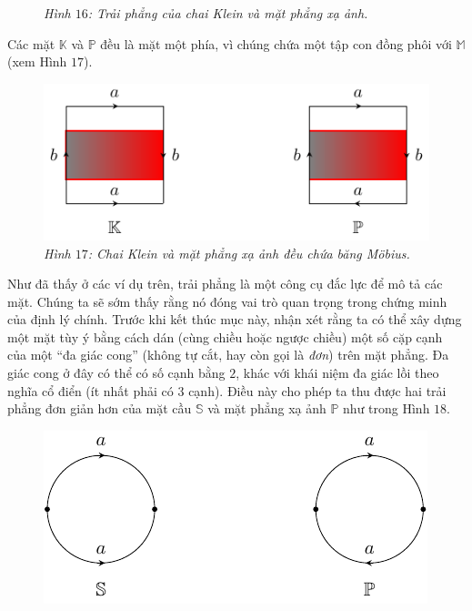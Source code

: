 \begin{multicols}{2}
\begin{figure}[H]
		\caption{\small\textit{\color{duongvaotoanhoc}Hình $16$: Trải phẳng của chai Klein và mặt phẳng xạ ảnh.}}
		\vspace*{-10pt}
	\end{figure}
	Các mặt $\mathbb{K}$ và $\mathbb{P}$ đều là mặt một phía, vì chúng chứa một tập con đồng phôi với $\mathbb{M}$ (xem Hình $17$).
	\begin{figure}[H]
		\vspace*{-5pt}
		\centering\captionsetup{labelformat=empty, justification=centering}
		\includegraphics[width=1\linewidth]{H17.pdf}
		\caption{\small\textit{\color{duongvaotoanhoc}Hình $17$: Chai Klein và mặt phẳng xạ ảnh đều chứa băng M\"obius.}}
		\vspace*{-10pt}
	\end{figure}
	Như đã thấy ở các ví dụ trên, trải phẳng là một công cụ đắc lực để mô tả các mặt. Chúng ta sẽ sớm thấy rằng nó đóng vai trò quan trọng trong chứng minh của định lý chính. Trước khi kết thúc mục này, nhận xét rằng ta có thể xây dựng một mặt tùy ý bằng cách dán (cùng chiều hoặc ngược chiều) một số cặp cạnh của một ``đa giác cong'' (không tự cắt, hay còn gọi là {\it đơn}) trên mặt phẳng. Đa giác cong ở đây có thể có số cạnh bằng $2$, khác với khái niệm đa giác lồi theo nghĩa cổ điển (ít nhất phải có $3$ cạnh). Điều này cho phép ta thu được hai trải phẳng đơn giản hơn của mặt cầu $\mathbb{S}$ và mặt phẳng xạ ảnh $\mathbb{P}$ như trong Hình $18$.
	\begin{figure}[H]
		\vspace*{-5pt}
		\centering\captionsetup{labelformat=empty, justification=centering}
		\includegraphics[width=1\linewidth]{H18.pdf}

\end{figure}
\end{multicols}
